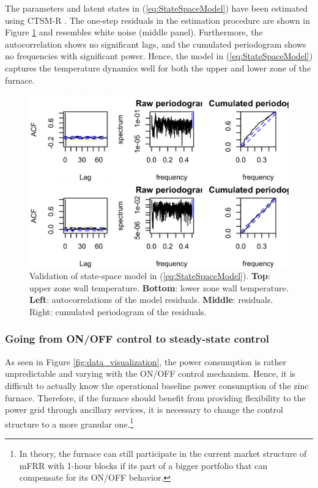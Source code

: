 \documentclass[lettersize,journal]{IEEEtran}
\begin{document}
The parameters and latent states in (\ref{eq:StateSpaceModel}) have been estimated using CTSM-R \cite{juhl2016ctsmr}. The one-step residuals in the estimation procedure are shown in Figure \ref{fig:4thOrderModelValidation} and resembles white noise (middle panel). Furthermore, the autocorrelation shows no significant lags, and the cumulated periodogram shows no frequencies with significant power. Hence, the model in (\ref{eq:StateSpaceModel}) captures the temperature dynamics well for both the upper and lower zone of the furnace.


\begin{figure}[!t]
    \centering
    \includegraphics[width=\columnwidth]{figures/4thOrderModelValidation.png}
    \caption{Validation of state-space model in (\ref{eq:StateSpaceModel}). \textbf{Top}: upper zone wall temperature. \textbf{Bottom}: lower zone wall temperature. \textbf{Left}: autocorrelations of the model residuals. \textbf{Middle}: residuals. \textrm{Right}: cumulated periodogram of the residuals.}
    \label{fig:4thOrderModelValidation}
\end{figure}


\subsubsection{Going from ON/OFF control to steady-state control}

As seen in Figure \ref{fig:data_visualization}, the power consumption is rather unpredictable and varying with the ON/OFF control mechanism. Hence, it is difficult to actually know the operational baseline power consumption of the zinc furnace. Therefore, if the furnace should benefit from providing flexibility to the power grid through ancillary services, it is necessary to change the control structure to a more granular one.\footnote{In theory, the furnace can still participate in the current market structure of mFRR with 1-hour blocks if its part of a bigger portfolio that can compensate for its ON/OFF behavior.}
\end{document}
